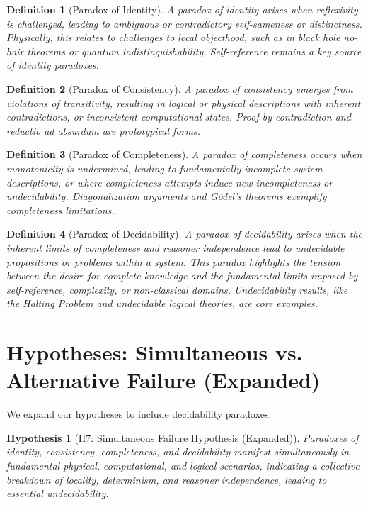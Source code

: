 \documentclass{article}
\newtheorem{definition}{Definition}
\newtheorem{hypothesis}{Hypothesis}
\begin{document}
	\begin{definition}[Paradox of Identity]
		A paradox of identity arises when reflexivity is challenged, leading to ambiguous or contradictory self-sameness or distinctness. Physically, this relates to challenges to local objecthood, such as in black hole no-hair theorems or quantum indistinguishability. Self-reference remains a key source of identity paradoxes.
	\end{definition}
	
	\begin{definition}[Paradox of Consistency]
		A paradox of consistency emerges from violations of transitivity, resulting in logical or physical descriptions with inherent contradictions, or inconsistent computational states. Proof by contradiction and reductio ad absurdum are prototypical forms.
	\end{definition}
	
	\begin{definition}[Paradox of Completeness]
		A paradox of completeness occurs when monotonicity is undermined, leading to fundamentally incomplete system descriptions, or where completeness attempts induce new incompleteness or undecidability. Diagonalization arguments and Gödel's theorems exemplify completeness limitations.
	\end{definition}
	
	\begin{definition}[Paradox of Decidability]
		A paradox of decidability arises when the inherent limits of completeness and reasoner independence lead to undecidable propositions or problems within a system. This paradox highlights the tension between the desire for complete knowledge and the fundamental limits imposed by self-reference, complexity, or non-classical domains. Undecidability results, like the Halting Problem and undecidable logical theories, are core examples.
	\end{definition}
	
	
	\section{Hypotheses: Simultaneous vs. Alternative Failure (Expanded)}
	
	We expand our hypotheses to include decidability paradoxes.
	
	\begin{hypothesis}[H7: Simultaneous Failure Hypothesis (Expanded)]
		Paradoxes of identity, consistency, completeness, and decidability manifest simultaneously in fundamental physical, computational, and logical scenarios, indicating a collective breakdown of locality, determinism, and reasoner independence, leading to essential undecidability.
	\end{hypothesis}
	
\end{document}
